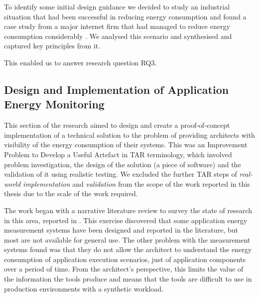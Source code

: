 To identify some initial design guidance we decided to study an industrial situation that had been successful in reducing energy consumption and found a case study from a major internet firm that had managed to reduce energy consumption considerably \cite{ebay2013-digitalefficiency}.  We analysed this scenario and synthesised and captured key principles from it.

This enabled us to answer research question RQ3.

\subsection{Design and Implementation of Application Energy Monitoring}

This section of the research aimed to design and create a proof-of-concept implementation of a technical solution to the problem of providing architects with visibility of the energy consumption of their systems.  This was an Improvement Problem to Develop a Useful Artefact in TAR terminology, which involved problem investigation, the design of the solution (a piece of software) and the validation of it using realistic testing.  We excluded the further TAR steps of \emph{real-world implementation} and \emph{validation} \cite{wieringa2012-tar} from the scope of the work reported in this thesis due to the scale of the work required.

The work began with a narrative literature review to survey the state of research in this area, reported in .  This exercise discovered that some application energy measurement systems have been designed and reported in the literature, but most are not available for general use.  The other problem with the measurement systems found was that they do not allow the architect to understand the energy consumption of application execution scenarios, just of application components over a period of time.  From the architect's perspective, this limits the value of the information the tools produce and means that the tools are difficult to use in production environments with a synthetic workload.

